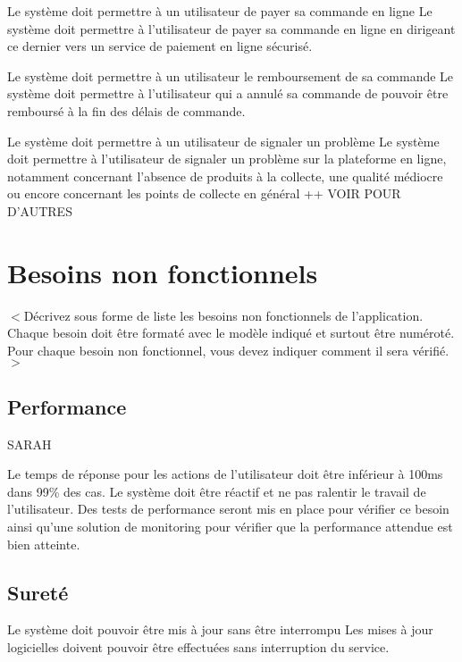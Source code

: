\begin{reqs}{Le système doit permettre à un utilisateur de payer sa commande en ligne}
Le système doit permettre à l'utilisateur de payer sa commande en ligne en dirigeant ce dernier vers un service de paiement en ligne sécurisé.
\end{reqs}

\begin{reqs}{Le système doit permettre à un utilisateur le remboursement de sa commande}
Le système doit permettre à l'utilisateur qui a annulé sa commande de pouvoir être remboursé à la fin des délais de commande.
\end{reqs}

\begin{reqs}{Le système doit permettre à un utilisateur de signaler un problème}
Le système doit permettre à l'utilisateur de signaler un problème sur la plateforme en ligne, notamment concernant l'absence de produits à la collecte, une qualité médiocre ou encore concernant les points de collecte en général ++ VOIR POUR D'AUTRES
\end{reqs}




\section{Besoins non fonctionnels}
$<$Décrivez sous forme de liste les besoins non fonctionnels de l'application. Chaque besoin doit être formaté avec le modèle indiqué et surtout être numéroté. Pour chaque besoin non fonctionnel, vous devez indiquer comment il sera vérifié.$>$

\subsection{Performance}
SARAH\\
\begin{reqs}{Le temps de réponse pour les actions de l'utilisateur doit être inférieur à 100ms dans 99\% des cas.}
Le système doit être réactif et ne pas ralentir le travail de l'utilisateur. Des tests de performance seront mis en place pour vérifier ce besoin ainsi qu'une solution de monitoring pour vérifier que la performance attendue est bien atteinte.
\end{reqs}

\subsection{Sureté}
\begin{reqs}{Le système doit pouvoir être mis à jour sans être interrompu}
Les mises à jour logicielles doivent pouvoir être effectuées sans interruption du service.
\end{reqs}

